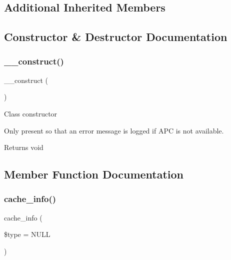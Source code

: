 \subsection*{Additional Inherited Members}


\subsection{Constructor \& Destructor Documentation}
\mbox{\label{class_c_i___cache__apc_a095c5d389db211932136b53f25f39685}} 
\subsubsection{\texorpdfstring{\+\_\+\+\_\+construct()}{\_\_construct()}}
{\footnotesize\ttfamily \+\_\+\+\_\+construct (\begin{DoxyParamCaption}{ }\end{DoxyParamCaption})}

Class constructor

Only present so that an error message is logged if A\+PC is not available.

\begin{DoxyReturn}{Returns}
void 
\end{DoxyReturn}


\subsection{Member Function Documentation}
\mbox{\label{class_c_i___cache__apc_aa8b9c4d9f0387156736ccd8850f0727e}} 
\subsubsection{\texorpdfstring{cache\+\_\+info()}{cache\_info()}}
{\footnotesize\ttfamily cache\+\_\+info (\begin{DoxyParamCaption}\item[{}]{\$type = {\ttfamily NULL} }\end{DoxyParamCaption})}

